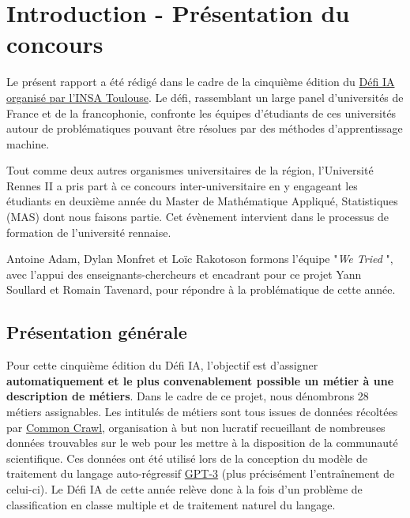 \chapter{Introduction - Présentation du concours}

Le présent rapport a été rédigé dans le cadre de la cinquième édition du \href{https://www.kaggle.com/c/defi-ia-insa-toulouse}{Défi IA organisé par l’INSA Toulouse}. Le défi, rassemblant un large panel d’universités de France et de la francophonie, confronte les équipes d’étudiants de ces universités autour de problématiques pouvant être résolues par des méthodes d’apprentissage machine.
\newline

Tout comme deux autres organismes universitaires de la région, l’Université Rennes II a pris part à ce concours inter-universitaire en y engageant les étudiants en deuxième année du Master de Mathématique Appliqué, Statistiques (MAS) dont nous faisons partie. Cet évènement intervient dans le processus de formation de l’université rennaise.
\newline

Antoine Adam, Dylan Monfret et Loïc Rakotoson formons l’équipe "\emph{We Tried} ", avec l’appui des enseignants-chercheurs et encadrant pour ce projet Yann Soullard et Romain Tavenard, pour répondre à la problématique de cette année.
\newline

\section{Présentation générale}

Pour cette cinquième édition du Défi IA, l’objectif est d’assigner \textbf{automatiquement et le plus convenablement possible un métier à une description de métiers}. Dans le cadre de ce projet, nous dénombrons 28 métiers assignables. Les intitulés de métiers sont tous issues de données récoltées par \href{https://en.wikipedia.org/wiki/Common_Crawl}{Common Crawl}, organisation à but non lucratif recueillant de nombreuses données trouvables sur le web pour les mettre à la disposition de la communauté scientifique. Ces données ont été utilisé lors de la conception du modèle de traitement du langage auto-régressif \href{https://fr.wikipedia.org/wiki/GPT-3}{GPT-3} (plus précisément l’entraînement de celui-ci). Le Défi IA de cette année relève donc à la fois d’un problème de classification en classe multiple et de traitement naturel du langage.
\newline

